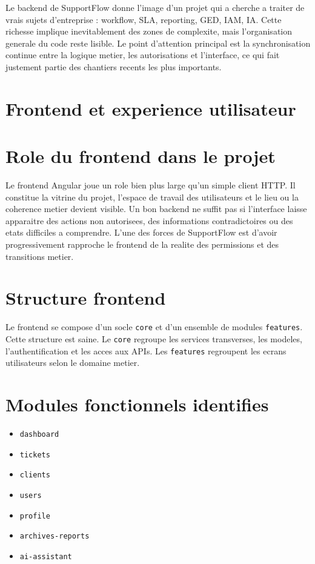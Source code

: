 Le backend de SupportFlow donne l'image d'un projet qui a cherche a traiter de vrais sujets d'entreprise : workflow, SLA, reporting, GED, IAM, IA. Cette richesse implique inevitablement des zones de complexite, mais l'organisation generale du code reste lisible. Le point d'attention principal est la synchronisation continue entre la logique metier, les autorisations et l'interface, ce qui fait justement partie des chantiers recents les plus importants.



\section{Frontend et experience utilisateur}

\section{Role du frontend dans le projet}

Le frontend Angular joue un role bien plus large qu'un simple client HTTP. Il constitue la vitrine du projet, l'espace de travail des utilisateurs et le lieu ou la coherence metier devient visible. Un bon backend ne suffit pas si l'interface laisse apparaitre des actions non autorisees, des informations contradictoires ou des etats difficiles a comprendre. L'une des forces de SupportFlow est d'avoir progressivement rapproche le frontend de la realite des permissions et des transitions metier.

\section{Structure frontend}

Le frontend se compose d'un socle \texttt{core} et d'un ensemble de modules \texttt{features}. Cette structure est saine. Le \texttt{core} regroupe les services transverses, les modeles, l'authentification et les acces aux APIs. Les \texttt{features} regroupent les ecrans utilisateurs selon le domaine metier.

\section{Modules fonctionnels identifies}

\begin{itemize}[leftmargin=1.2cm]
  \item \texttt{dashboard}
  \item \texttt{tickets}
  \item \texttt{clients}
  \item \texttt{users}
  \item \texttt{profile}
  \item \texttt{archives-reports}
  \item \texttt{ai-assistant}
\end{itemize}


